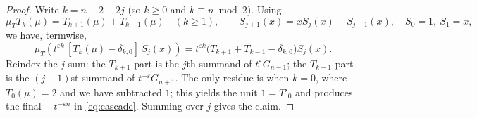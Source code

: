 \documentclass[10pt,a4paper]{amsart}
\begin{document}
\begin{proof}
Write $k=n-2-2j$ (so $k\ge0$ and $k\equiv n\bmod 2$). Using
\[
\mu_T T_k(\mu)=T_{k+1}(\mu)+T_{k-1}(\mu)\quad(k\ge1),\qquad
S_{j+1}(x)=xS_j(x)-S_{j-1}(x),\quad S_0=1,\ S_1=x,
\]
we have, termwise,
\[
\mu_T\!\left(t^{\varepsilon k}\,[T_k(\mu)-\delta_{k,0}]\,S_j(x)\right)
= t^{\varepsilon k}\big(T_{k+1}+T_{k-1}-\delta_{k,0}\big)S_j(x).
\]
Reindex the $j$-sum: the $T_{k+1}$ part is the $j$th summand of $t^{\varepsilon}G_{n-1}$; the $T_{k-1}$ part
is the $(j+1)$st summand of $t^{-\varepsilon}G_{n+1}$. The only residue is when $k=0$,
where $T_0(\mu)=2$ and we have subtracted $1$; this yields the unit $1=T'_0$ and produces the final
$-\,t^{-\varepsilon n}$ in \eqref{eq:cascade}. Summing over $j$ gives the claim.
\end{proof}
\end{document}
